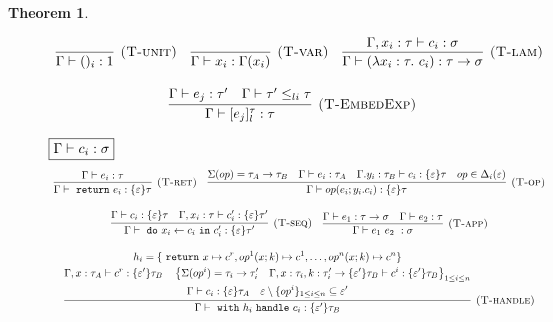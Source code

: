 \documentclass{article}
\newtheorem{theorem}{Theorem}[section]
\newcommand{\m}[1]{\ \texttt{#1}\ }
\begin{document}
\begin{theorem}
\begin{figure}[H]
{\[\begin{array}{c}
\infer[\textsc{(T-unit)}]
  {\Gamma \vdash ()_i : 1}
  {} \quad 

\infer[\textsc{(T-var)}]
  {\Gamma \vdash x_i : \Gamma(x_i)}
  {} \quad 

\infer[\textsc{(T-lam)}]
  {\Gamma \vdash (\lambda x_i: \tau.\ c_i) : \tau \rightarrow \sigma}
  {\Gamma, x_i:\tau \vdash c_i : \sigma} \\[3ex]
  
\infer[\textsc{(T-EmbedExp)}]
  {\Gamma \vdash [e_j]^\tau_l : \tau}
  {\Gamma \vdash e_j : \tau' & \Gamma \vdash \tau' \leq_{li} \tau} \quad  
\end{array} \\[3ex]
\]


\noindent$\fbox{$\Gamma \vdash c_i : \sigma$}$
\[
\begin{array}{c}

\infer[\textsc{(T-ret)}]
  {\Gamma\vdash \m{return} e_i : \{\varepsilon\}\tau }
  {\Gamma\vdash e_i : \tau} \quad 
  
\infer[\textsc{(T-op)}]
  {\Gamma\vdash op(e_i; y_i.c_i) : \{\varepsilon\}\tau }
  {\Sigma(op) = \tau_A \rightarrow \tau_B & \Gamma \vdash e_i : \tau_A & \Gamma. y_i:\tau_B\vdash c_i: \{\varepsilon\}\tau & op \in \Delta_i(\varepsilon)} \\[3ex]


\infer[\textsc{(T-seq)}]
  {\Gamma\vdash \m{do} x_i \leftarrow c_i \m{in} c_i' : \{\varepsilon\}\tau' }
  {\Gamma \vdash c_i : \{\varepsilon\}\tau & \Gamma, x_i:\tau \vdash c_i': \{\varepsilon\}\tau'} \quad 
  
  
\infer[\textsc{(T-app)}]
  {\Gamma\vdash e_1\ e_2\ : \sigma }
  {\Gamma \vdash e_1 : \tau \rightarrow \sigma & \Gamma \vdash e_2 : \tau} \\[3ex]
  
\infer[\textsc{(T-handle)}]
  {\Gamma\vdash \m{with} h_i \m{handle} c_i: \{\varepsilon'\} \tau_B}
  {\begin{gathered}
  h_i = \{\m{return} x \mapsto c^r, op^1(x;k) \mapsto c^1, \dots, op^n(x;k) \mapsto c^n \}\\
  \Gamma, x: \tau_A \vdash c^r : \{\varepsilon'\}\tau_B \quad
  \left\{ \Sigma(op^i) = \tau_i \rightarrow \tau_i'  \quad \Gamma, x:\tau_i, k:\tau_i' \rightarrow \{\varepsilon'\}\tau_B \vdash c^i: \{\varepsilon'\}\tau_B    \right\}_{1 \leq i \leq n} \\
  \Gamma \vdash c_i : \{\varepsilon\}\tau_A \quad \varepsilon \setminus \{op^i\}_{1 \leq i \leq n} \subseteq \varepsilon'
  \end{gathered}} \\[3ex]
  

\end{array}\]}
\end{figure}
\end{theorem}
\end{document}
